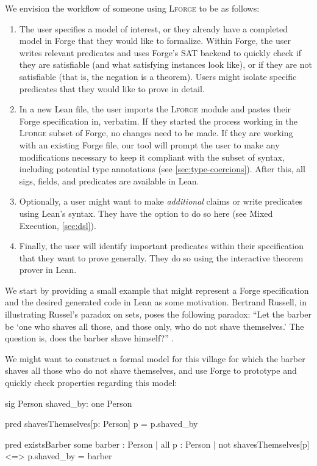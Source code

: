 We envision the workflow of someone using \textsc{Lforge} to be as follows: 
\begin{enumerate}
    \item The user specifies a model of interest, or they already have a completed model in Forge that they would like to formalize. Within Forge, the user writes relevant predicates and uses Forge's SAT backend to quickly check if they are satisfiable (and what satisfying instances look like), or if they are not satisfiable (that is, the negation is a theorem). Users might isolate specific predicates that they would like to prove in detail. 
    \item In a new Lean file, the user imports the \textsc{Lforge} module and pastes their Forge specification in, verbatim. If they started the process working in the \textsc{Lforge} subset of Forge, no changes need to be made. If they are working with an existing Forge file, our tool will prompt the user to make any modifications necessary to keep it compliant with the subset of syntax, including potential type annotations (see \cref{sec:type-coercions}). After this, all sigs, fields, and predicates are available in Lean. 
    \item Optionally, a user might want to make \emph{additional} claims or write predicates using Lean's syntax. They have the option to do so here (see Mixed Execution, \cref{sec:dsl}). 
    \item Finally, the user will identify important predicates within their specification that they want to prove generally. They do so using the interactive theorem prover in Lean. 
\end{enumerate}

We start by providing a small example that might represent a Forge specification and the desired generated code in Lean as some motivation. Bertrand Russell, in illustrating Russel's paradox on sets, poses the following paradox: ``Let the barber be `one who shaves all those, and those only, who do not shave themselves.' The question is, does the barber shave himself?'' \cite[101]{russell2009philosophy}. 

We might want to construct a formal model for this village for which the barber shaves all those who do not shave themselves, and use Forge to prototype and quickly check properties regarding this model: 

\begin{forge*}
sig Person {
  shaved_by: one Person
}

pred shavesThemselves[p: Person] {
  p = p.shaved_by
}

pred existsBarber {
  some barber : Person | all p : Person | {
    not shavesThemselves[p] <=> p.shaved_by = barber
  }
}
\end{forge*}

